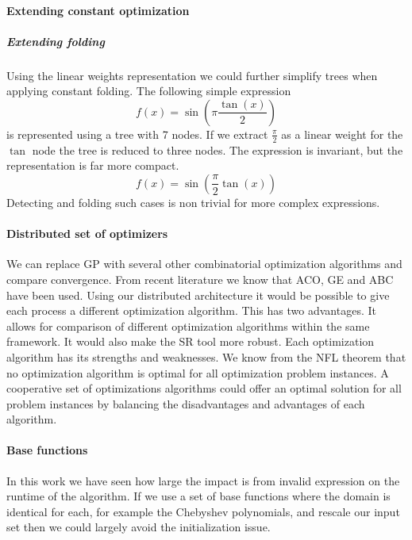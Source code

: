 \paragraph{Extending constant optimization}
\subparagraph{Extending folding}
Using the linear weights representation we could further simplify trees when applying constant folding. The following simple expression
\[
f(x) = \sin( \pi \frac{\tan(x)}{2})
\]
is represented using a tree with 7 nodes. If we extract $\frac{\pi}{2}$ as a linear weight for the $\tan$ node the tree is reduced to three nodes. The expression is invariant, but the representation is far more compact.
\[
f(x) = \sin( \frac{\pi}{2} \tan(x))
\]
Detecting and folding such cases is non trivial for more complex expressions.

\paragraph{Distributed set of optimizers}
We can replace GP with several other combinatorial optimization algorithms and compare convergence. From recent literature we know that ACO, GE and ABC have been used. Using our distributed architecture it would be possible to give each process a different optimization algorithm. This has two advantages. It allows for comparison of different optimization algorithms within the same framework. It would also make the SR tool more robust. Each optimization algorithm has its strengths and weaknesses. We know from the NFL theorem that no optimization algorithm is optimal for all optimization problem instances. A cooperative set of optimizations algorithms could offer an optimal solution for all problem instances by balancing the disadvantages and advantages of each algorithm.

\paragraph{Base functions}
In this work we have seen how large the impact is from invalid expression on the runtime of the algorithm. If we use a set of base functions where the domain is identical for each, for example the Chebyshev polynomials, and rescale our input set then we could largely avoid the initialization issue.

